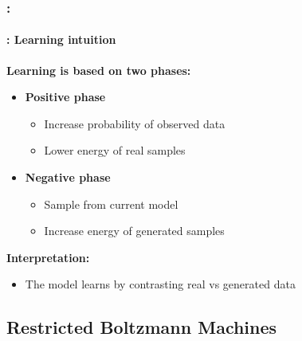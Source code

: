 \documentclass[xcolor=table]{beamer}
\begin{document}
	\begin{frame}
		\frametitle{\insertshortsubtitle: \insertsection}
		\framesubtitle{\insertsubsection: Learning intuition}
		
		\textbf{Learning is based on two phases:}
		
		\begin{itemize}
			
			\item \textbf{Positive phase}
			\begin{itemize}
				\item Increase probability of observed data
				\item Lower energy of real samples
			\end{itemize}
			
			\item \textbf{Negative phase}
			\begin{itemize}
				\item Sample from current model
				\item Increase energy of generated samples
			\end{itemize}
			
		\end{itemize}
		
		\vspace{0.5em}
		
		\textbf{Interpretation:}
		\begin{itemize}
			\item The model learns by contrasting real vs generated data
		\end{itemize}
		
	\end{frame}
	
	\subsection{Restricted Boltzmann Machines}
	
\end{document}
